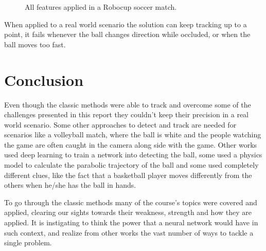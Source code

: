\documentclass[10pt,twocolumn,letterpaper]{article}
\begin{document}
  \begin{figure}[!h]
    \centering
    \setlength{\fboxsep}{1pt}
    \setlength{\fboxrule}{1pt}
    \caption{All features applied in a Robocup soccer match.}\label{fig:robocup_1}
  \end{figure}

  When applied to a real world scenario the solution can keep tracking up to a
  point, it fails whenever the ball changes direction while occluded, or when
  the ball moves too fast.

\section{Conclusion}

  Even though the classic methods were able to track and overcome some of the
  challenges presented in this report they couldn't keep their precision in a real world
  scenario. Some other approaches to detect and track are needed for scenarios
  like a volleyball match, where the ball is white and the people watching the
  game are often caught in the camera along side with the game. Other works used deep
  learning to train a network into detecting the ball, some used a physics model
  to calculate the parabolic trajectory of the ball and some used completely
  different clues, like the fact that a basketball player moves differently from
  the others when he/she has the ball in hands.

  To go through the classic methods many of the course's topics were covered and
  applied, clearing our sights towards their weakness, strength and how they are
  applied. It is instigating to think the power that a neural network would have
  in such context, and realize from other works the vast number of ways to
  tackle a single problem.

{\small


}
\end{document}
